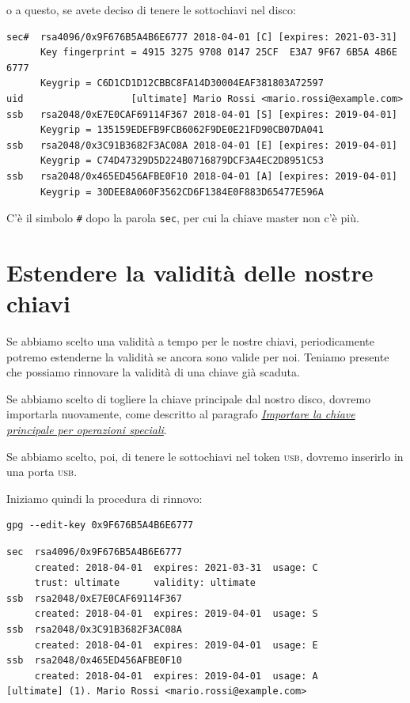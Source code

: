 \documentclass[a4paper,10pt]{article}
\begin{document}
o a questo, se avete deciso di tenere le sottochiavi nel disco:

\begin{lstlisting}
sec#  rsa4096/0x9F676B5A4B6E6777 2018-04-01 [C] [expires: 2021-03-31]
      Key fingerprint = 4915 3275 9708 0147 25CF  E3A7 9F67 6B5A 4B6E 6777
      Keygrip = C6D1CD1D12CBBC8FA14D30004EAF381803A72597
uid                   [ultimate] Mario Rossi <mario.rossi@example.com>
ssb   rsa2048/0xE7E0CAF69114F367 2018-04-01 [S] [expires: 2019-04-01]
      Keygrip = 135159EDEFB9FCB6062F9DE0E21FD90CB07DA041
ssb   rsa2048/0x3C91B3682F3AC08A 2018-04-01 [E] [expires: 2019-04-01]
      Keygrip = C74D47329D5D224B0716879DCF3A4EC2D8951C53
ssb   rsa2048/0x465ED456AFBE0F10 2018-04-01 [A] [expires: 2019-04-01]
      Keygrip = 30DEE8A060F3562CD6F1384E0F883D65477E596A
\end{lstlisting}


C'è il simbolo \texttt{\#} dopo la parola \texttt{sec}, per cui la chiave master non c'è più.

\section{Estendere la validità delle nostre chiavi}

Se abbiamo scelto una validità a tempo per le nostre chiavi, periodicamente potremo estenderne la validità se ancora sono valide per noi. Teniamo presente che possiamo rinnovare la validità di una chiave già scaduta.

Se abbiamo scelto di togliere la chiave principale dal nostro disco, dovremo importarla nuovamente, come descritto al paragrafo \textit{\hyperref[importare-chiave]{Importare la chiave principale per operazioni speciali}}.

Se abbiamo scelto, poi, di tenere le sottochiavi nel token \textsc{usb}, dovremo inserirlo in una porta \textsc{usb}.

Iniziamo quindi la procedura di rinnovo:

\begin{lstlisting}
gpg --edit-key 0x9F676B5A4B6E6777
\end{lstlisting}

\begin{lstlisting}
sec  rsa4096/0x9F676B5A4B6E6777
     created: 2018-04-01  expires: 2021-03-31  usage: C
     trust: ultimate      validity: ultimate
ssb  rsa2048/0xE7E0CAF69114F367
     created: 2018-04-01  expires: 2019-04-01  usage: S
ssb  rsa2048/0x3C91B3682F3AC08A
     created: 2018-04-01  expires: 2019-04-01  usage: E
ssb  rsa2048/0x465ED456AFBE0F10
     created: 2018-04-01  expires: 2019-04-01  usage: A
[ultimate] (1). Mario Rossi <mario.rossi@example.com>
\end{lstlisting}
\end{document}
